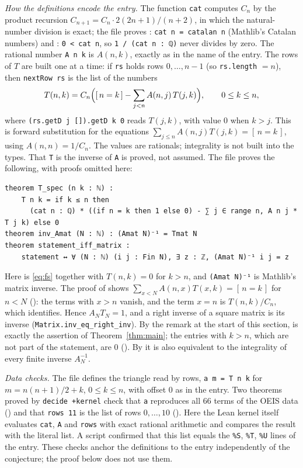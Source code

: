 \documentclass[11pt]{amsart}
\theoremstyle{plain}
\theoremstyle{definition}
\newcommand{\ib}[1]{[\,#1\,]}
\begin{document}
\emph{How the definitions encode the entry.} The function \texttt{cat} computes $C_n$ by the product recursion $C_{n+1}=C_n\cdot 2(2n+1)/(n+2)$, in which the natural-number division is exact; the file proves : \texttt{cat n = catalan n} (Mathlib's Catalan numbers) and : \texttt{0 < cat n}, so \texttt{1 / (cat n : ℚ)} never divides by zero. The rational number \texttt{A n k} is $A(n,k)$, exactly as in the name of the entry. The rows of $T$ are built one at a time: if \texttt{rs} holds rows $0,\dots,n-1$ (so \texttt{rs.length} $=n$), then \texttt{nextRow rs} is the list of the numbers
\begin{equation}\label{eq:fs}
  T(n,k)=C_n\Bigl(\ib{n=k}-\sum_{j<n}A(n,j)\,T(j,k)\Bigr),\qquad 0\le k\le n,
\end{equation}
where \texttt{(rs.getD j []).getD k 0} reads $T(j,k)$, with value $0$ when $k>j$. This is forward substitution for the equations $\sum_{j\le n}A(n,j)T(j,k)=\ib{n=k}$, using $A(n,n)=1/C_n$. The values are rationals; integrality is not built into the types. That \texttt{T} is the inverse of \texttt{A} is proved, not assumed. The file proves the following, with proofs omitted here:
\begin{lstlisting}
theorem T_spec (n k : ℕ) :
    T n k = if k ≤ n then
      (cat n : ℚ) * ((if n = k then 1 else 0) - ∑ j ∈ range n, A n j * T j k) else 0
theorem inv_Amat (N : ℕ) : (Amat N)⁻¹ = Tmat N
theorem statement_iff_matrix :
    statement ↔ ∀ (N : ℕ) (i j : Fin N), ∃ z : ℤ, (Amat N)⁻¹ i j = z
\end{lstlisting}
Here  is \eqref{eq:fs} together with $T(n,k)=0$ for $k>n$, and \texttt{(Amat N)⁻¹} is Mathlib's matrix inverse. The proof of  shows $\sum_{x<N}A(n,x)T(x,k)=\ib{n=k}$ for $n<N$ (): the terms with $x>n$ vanish, and the term $x=n$ is $T(n,k)/C_n$, which  identifies. Hence $A_NT_N=1$, and a right inverse of a square matrix is its inverse (\texttt{Matrix.inv\_eq\_right\_inv}). By the remark at the start of this section,  is exactly the assertion of Theorem~\ref{thm:main}; the entries with $k>n$, which are not part of the statement, are $0$ (). By  it is also equivalent to the integrality of every finite inverse $A_N^{-1}$.

\emph{Data checks.} The file defines the triangle read by rows, \texttt{a m = T n k} for $m=n(n+1)/2+k$, $0\le k\le n$, with offset $0$ as in the entry. Two theorems proved by \texttt{decide +kernel} check that \texttt{a} reproduces all $66$ terms of the OEIS data () and that \texttt{rows 11} is the list of rows $0,\dots,10$ (). Here the Lean kernel itself evaluates \texttt{cat}, \texttt{A} and \texttt{rows} with exact rational arithmetic and compares the result with the literal list. A script confirmed that this list equals the \texttt{\%S}, \texttt{\%T}, \texttt{\%U} lines of the entry. These checks anchor the definitions to the entry independently of the conjecture; the proof below does not use them.
\end{document}
